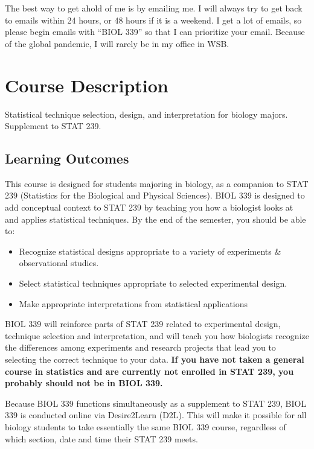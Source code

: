 \documentclass{tufte-handout}
\begin{document}
\begin{fullwidth}

 The best way to get ahold of me is by emailing me. I will always try to get back to emails within 24 hours, or 48 hours if it is a weekend. I get a lot of emails, so please begin emails with ``BIOL 339'' so that I can prioritize your email. Because of the global pandemic, I will rarely be in my office in WSB.

\section{Course Description}

Statistical technique selection, design, and interpretation for biology majors. Supplement to STAT 239. 

\subsection{Learning Outcomes}

This course is designed for students majoring in biology, as a companion to STAT 239 (Statistics for the Biological and Physical Sciences). BIOL 339 is designed to add conceptual context to STAT 239 by teaching you how a biologist looks at and applies statistical techniques. By the end of the semester, you should be able to: 

\begin{itemize}
\item Recognize  statistical designs appropriate to a variety of experiments \& observational studies.
\item Select statistical techniques appropriate to selected experimental design.
\item Make appropriate interpretations from statistical applications 
\end{itemize}

BIOL 339 will reinforce parts of STAT 239 related to experimental design, technique selection and interpretation, and will teach you how biologists recognize the differences among experiments and research projects that lead you to selecting the correct technique to your data. \textbf{If you have not taken a general course in statistics and are currently not enrolled in STAT 239, you probably should not be in BIOL 339.}

Because BIOL 339 functions simultaneously as a supplement to STAT 239, BIOL 339 is conducted online via Desire2Learn (D2L). This will make it possible for all biology students to take essentially the same BIOL 339 course, regardless of which section, date and time their STAT 239 meets. 




\end{fullwidth}
\end{document}
